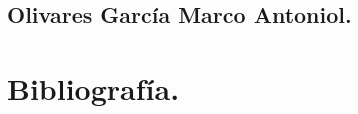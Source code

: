 \documentclass[oneside,10pt]{book}
\begin{document}
\section{Olivares García Marco Antoniol.}


\chapter{Bibliografía.}

	
\end{document}
